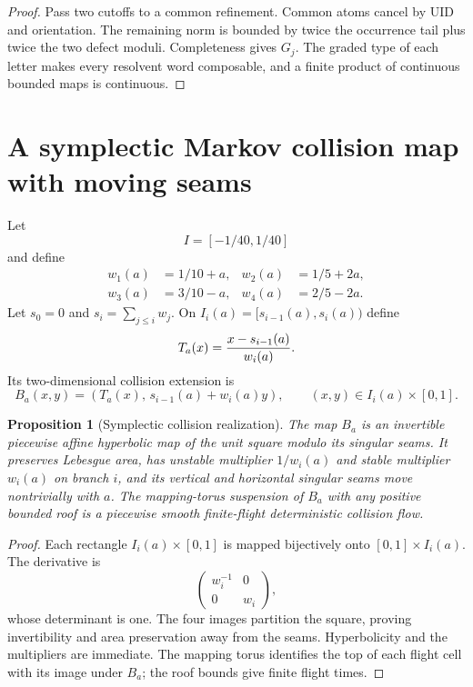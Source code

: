 \documentclass[11pt,reqno]{amsart}
\newtheorem{proposition}[theorem]{Proposition}
\theoremstyle{definition}
\theoremstyle{remark}
\begin{document}
\begin{proof}
Pass two cutoffs to a common refinement.  Common atoms cancel by UID and
orientation.  The remaining norm is bounded by twice the occurrence tail plus
twice the two defect moduli.  Completeness gives $G_j$.  The graded type of
each letter makes every resolvent word composable, and a finite product of
continuous bounded maps is continuous.
\end{proof}

\section{A symplectic Markov collision map with moving seams}

Let
\[
 I=[-1/40,1/40]
\]
and define
\begin{align*}
 w_1(a)&=1/10+a,& w_2(a)&=1/5+2a,\\
 w_3(a)&=3/10-a,& w_4(a)&=2/5-2a.
\end{align*}
Let $s_0=0$ and $s_i=\sum_{j\le i}w_j$.  On
$I_i(a)=[s_{i-1}(a),s_i(a))$ define
\begin{equation}\label{eq:T}
 T_a(x)={x-s_{i-1}(a)\over w_i(a)}.
\end{equation}
Its two-dimensional collision extension is
\begin{equation}\label{eq:baker}
 B_a(x,y)=\left(T_a(x),\,s_{i-1}(a)+w_i(a)y\right),
 \qquad (x,y)\in I_i(a)\times[0,1].
\end{equation}

\begin{proposition}[Symplectic collision realization]\label{prop:symplectic}
The map $B_a$ is an invertible piecewise affine hyperbolic map of the unit
square modulo its singular seams.  It preserves Lebesgue area, has unstable
multiplier $1/w_i(a)$ and stable multiplier $w_i(a)$ on branch $i$, and its
vertical and horizontal singular seams move nontrivially with $a$.  The
mapping-torus suspension of $B_a$ with any positive bounded roof is a
piecewise smooth finite-flight deterministic collision flow.
\end{proposition}

\begin{proof}
Each rectangle $I_i(a)\times[0,1]$ is mapped bijectively onto
$[0,1]\times I_i(a)$.  The derivative is
\[
 \begin{pmatrix}w_i^{-1}&0\\0&w_i\end{pmatrix},
\]
whose determinant is one.  The four images partition the square, proving
invertibility and area preservation away from the seams.  Hyperbolicity and
the multipliers are immediate.  The mapping torus identifies the top of each
flight cell with its image under $B_a$; the roof bounds give finite flight
times.
\end{proof}
\end{document}
